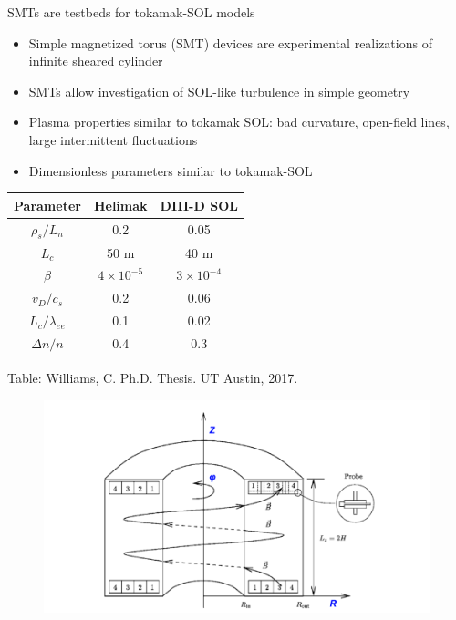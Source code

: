 \documentclass[12pt,table]{beamer}
\begin{document}
\begin{frame}{SMTs are testbeds for tokamak-SOL models}
    \begin{minipage}[t]{0.45\linewidth}
    \begin{itemize} \scriptsize
        \item Simple magnetized torus (SMT) devices are experimental realizations of infinite sheared cylinder
        \item SMTs allow investigation of SOL-like turbulence in simple geometry
        \item Plasma properties similar to tokamak SOL: bad curvature, open-field lines, large intermittent fluctuations
        \item Dimensionless parameters similar to tokamak-SOL
    \end{itemize}
    \begin{center}
        \tiny
        \begin{tabular}{c|c|c}
            Parameter & Helimak & DIII-D SOL \\ \hline 
            $\rho_s/L_n$ & 0.2 & 0.05 \\
            $L_c$ & 50 m & 40 m\\
            $\beta$ & $4 \times 10^{-5}$ & $3 \times 10^{-4}$ \\
            $v_D/c_s$ & 0.2 & 0.06 \\
            $L_c/\lambda_{ee}$ & 0.1 & 0.02 \\
            $\Delta n/n$ & 0.4 & 0.3 \\
        \end{tabular}
        \end{center}
        \begin{center}
        \vspace*{-.25cm}
        \tiny Table: Williams, C. Ph.D. Thesis. UT Austin, 2017.
    \end{center}
    \end{minipage}%
    \begin{minipage}[t]{0.5\linewidth}
    \vspace{-.25cm}
        \begin{figure}
        \captionsetup{width=.6\linewidth}
        \centering
        \includegraphics[width=1.3\linewidth,clip,trim=1cm 0cm 0cm 0cm]{figs/heli-cross-sec1.png} \\

\end{figure}
\end{minipage}
\end{frame}
\end{document}
